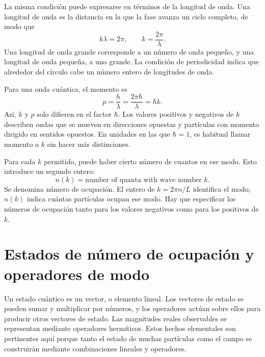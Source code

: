 La misma condición puede expresarse en términos de la longitud de onda. Una longitud de onda es la distancia en la que la fase avanza un ciclo completo, de modo que
\begin{equation}
k\lambda=2\pi,
\qquad
k=\frac{2\pi}{\lambda}.
\end{equation}
Una longitud de onda grande corresponde a un número de onda pequeño, y una longitud de onda pequeña, a uno grande. La condición de periodicidad indica que alrededor del círculo cabe un número entero de longitudes de onda.

Para una onda cuántica, el momento es
\begin{equation}
p=\frac{h}{\lambda}
=\frac{2\pi\hbar}{\lambda}
=\hbar k.
\end{equation}
Así, \(k\) y \(p\) solo difieren en el factor \(\hbar\). Los valores positivos y negativos de \(k\) describen ondas que se mueven en direcciones opuestas y partículas con momento dirigido en sentidos opuestos. En unidades en las que \(\hbar=1\), es habitual llamar momento a \(k\) sin hacer más distinciones.

Para cada \(k\) permitido, puede haber cierto número de cuantos en ese modo. Esto introduce un segundo entero:
\begin{equation}
n(k)=\text{number of quanta with wave number }k.
\end{equation}
Se denomina número de ocupación. El entero de \(k=2\pi n/L\) identifica el modo; \(n(k)\) indica cuántas partículas ocupan ese modo. Hay que especificar los números de ocupación tanto para los valores negativos como para los positivos de \(k\).

\begin{classroomqa}
\end{classroomqa}

\section{Estados de número de ocupación y operadores de modo}

Un estado cuántico es un vector, o elemento lineal. Los vectores de estado se pueden sumar y multiplicar por números, y los operadores actúan sobre ellos para producir otros vectores de estado. Las magnitudes reales observables se representan mediante operadores hermíticos. Estos hechos elementales son pertinentes aquí porque tanto el estado de muchas partículas como el campo se construirán mediante combinaciones lineales y operadores.

